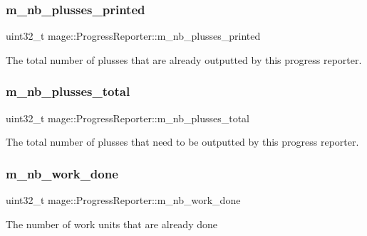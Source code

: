 \subsubsection{\texorpdfstring{m\+\_\+nb\+\_\+plusses\+\_\+printed}{m\_nb\_plusses\_printed}}
{\footnotesize\ttfamily uint32\+\_\+t mage\+::\+Progress\+Reporter\+::m\+\_\+nb\+\_\+plusses\+\_\+printed\hspace{0.3cm}{\ttfamily [private]}}

The total number of plusses that are already outputted by this progress reporter. \hypertarget{classmage_1_1_progress_reporter_aeae54fa7c542ccfbdaa44c0942c483fd}{}\label{classmage_1_1_progress_reporter_aeae54fa7c542ccfbdaa44c0942c483fd} 
\subsubsection{\texorpdfstring{m\+\_\+nb\+\_\+plusses\+\_\+total}{m\_nb\_plusses\_total}}
{\footnotesize\ttfamily uint32\+\_\+t mage\+::\+Progress\+Reporter\+::m\+\_\+nb\+\_\+plusses\+\_\+total\hspace{0.3cm}{\ttfamily [private]}}

The total number of plusses that need to be outputted by this progress reporter. \hypertarget{classmage_1_1_progress_reporter_ad3cb941594f138c208fa522a355a985b}{}\label{classmage_1_1_progress_reporter_ad3cb941594f138c208fa522a355a985b} 
\subsubsection{\texorpdfstring{m\+\_\+nb\+\_\+work\+\_\+done}{m\_nb\_work\_done}}
{\footnotesize\ttfamily uint32\+\_\+t mage\+::\+Progress\+Reporter\+::m\+\_\+nb\+\_\+work\+\_\+done\hspace{0.3cm}{\ttfamily [private]}}

The number of work units that are already done \hypertarget{classmage_1_1_progress_reporter_a1b0c8d8f3cde82161b34897c5e95e09b}{}\label{classmage_1_1_progress_reporter_a1b0c8d8f3cde82161b34897c5e95e09b} 
